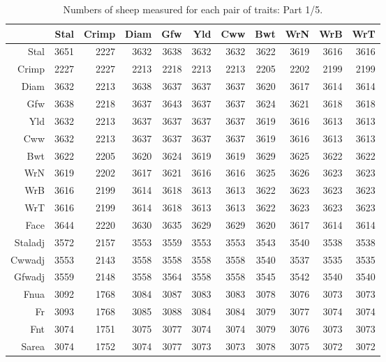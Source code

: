 \begin{table}[p]
\footnotesize
\centering
\caption{Numbers of sheep measured for each pair of traits: Part 1/5.} 
\label{tab:counts1}
\begin{tabular}{rrrrrrrrrrr}
  \hline
 & Stal & Crimp & Diam & Gfw & Yld & Cww & Bwt & WrN & WrB & WrT \\ 
  \hline
Stal & 3651 & 2227 & 3632 & 3638 & 3632 & 3632 & 3622 & 3619 & 3616 & 3616 \\ 
  Crimp & 2227 & 2227 & 2213 & 2218 & 2213 & 2213 & 2205 & 2202 & 2199 & 2199 \\ 
  Diam & 3632 & 2213 & 3638 & 3637 & 3637 & 3637 & 3620 & 3617 & 3614 & 3614 \\ 
  Gfw & 3638 & 2218 & 3637 & 3643 & 3637 & 3637 & 3624 & 3621 & 3618 & 3618 \\ 
  Yld & 3632 & 2213 & 3637 & 3637 & 3637 & 3637 & 3619 & 3616 & 3613 & 3613 \\ 
  Cww & 3632 & 2213 & 3637 & 3637 & 3637 & 3637 & 3619 & 3616 & 3613 & 3613 \\ 
  Bwt & 3622 & 2205 & 3620 & 3624 & 3619 & 3619 & 3629 & 3625 & 3622 & 3622 \\ 
  WrN & 3619 & 2202 & 3617 & 3621 & 3616 & 3616 & 3625 & 3626 & 3623 & 3623 \\ 
  WrB & 3616 & 2199 & 3614 & 3618 & 3613 & 3613 & 3622 & 3623 & 3623 & 3623 \\ 
  WrT & 3616 & 2199 & 3614 & 3618 & 3613 & 3613 & 3622 & 3623 & 3623 & 3623 \\ 
  Face & 3644 & 2220 & 3630 & 3635 & 3629 & 3629 & 3620 & 3617 & 3614 & 3614 \\ 
  Staladj & 3572 & 2157 & 3553 & 3559 & 3553 & 3553 & 3543 & 3540 & 3538 & 3538 \\ 
  Cwwadj & 3553 & 2143 & 3558 & 3558 & 3558 & 3558 & 3540 & 3537 & 3535 & 3535 \\ 
  Gfwadj & 3559 & 2148 & 3558 & 3564 & 3558 & 3558 & 3545 & 3542 & 3540 & 3540 \\ 
  Fnua & 3092 & 1768 & 3084 & 3087 & 3083 & 3083 & 3078 & 3076 & 3073 & 3073 \\ 
  Fr & 3093 & 1768 & 3085 & 3088 & 3084 & 3084 & 3079 & 3077 & 3074 & 3074 \\ 
  Fnt & 3074 & 1751 & 3075 & 3077 & 3074 & 3074 & 3079 & 3076 & 3073 & 3073 \\ 
  Sarea & 3074 & 1752 & 3074 & 3077 & 3073 & 3073 & 3078 & 3075 & 3072 & 3072 \\ 

\end{tabular}
\end{table}
